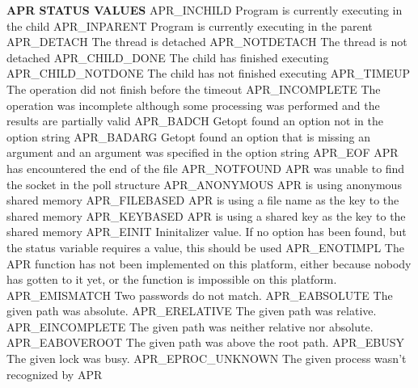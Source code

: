 \begin{DoxyPre}
{\bfseries APR STATUS VALUES}
APR\_INCHILD        Program is currently executing in the child
APR\_INPARENT       Program is currently executing in the parent
APR\_DETACH         The thread is detached
APR\_NOTDETACH      The thread is not detached
APR\_CHILD\_DONE     The child has finished executing
APR\_CHILD\_NOTDONE  The child has not finished executing
APR\_TIMEUP         The operation did not finish before the timeout
APR\_INCOMPLETE     The operation was incomplete although some processing
                   was performed and the results are partially valid
APR\_BADCH          Getopt found an option not in the option string
APR\_BADARG         Getopt found an option that is missing an argument
                   and an argument was specified in the option string
APR\_EOF            APR has encountered the end of the file
APR\_NOTFOUND       APR was unable to find the socket in the poll structure
APR\_ANONYMOUS      APR is using anonymous shared memory
APR\_FILEBASED      APR is using a file name as the key to the shared memory
APR\_KEYBASED       APR is using a shared key as the key to the shared memory
APR\_EINIT          Ininitalizer value.  If no option has been found, but
                   the status variable requires a value, this should be used
APR\_ENOTIMPL       The APR function has not been implemented on this
                   platform, either because nobody has gotten to it yet,
                   or the function is impossible on this platform.
APR\_EMISMATCH      Two passwords do not match.
APR\_EABSOLUTE      The given path was absolute.
APR\_ERELATIVE      The given path was relative.
APR\_EINCOMPLETE    The given path was neither relative nor absolute.
APR\_EABOVEROOT     The given path was above the root path.
APR\_EBUSY          The given lock was busy.
APR\_EPROC\_UNKNOWN  The given process wasn't recognized by APR
\end{DoxyPre}
 

